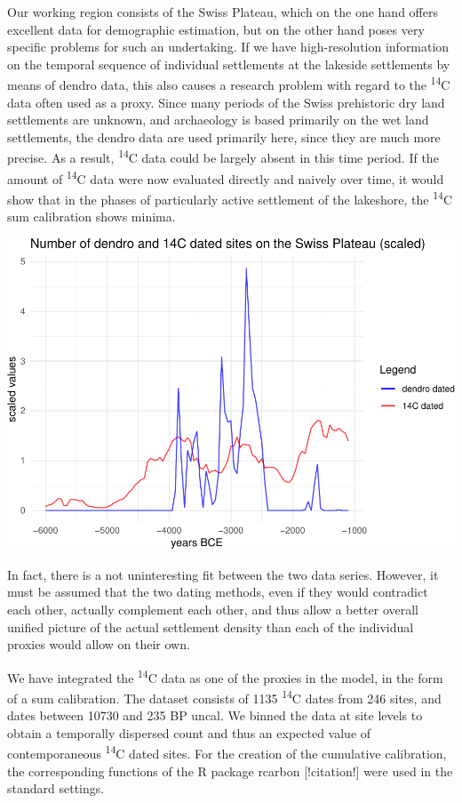 \documentclass[
]{article}
\begin{document}
Our working region consists of the Swiss Plateau, which on the one hand offers excellent data for demographic estimation, but on the other hand poses very specific problems for such an undertaking. If we have high-resolution information on the temporal sequence of individual settlements at the lakeside settlements by means of dendro data, this also causes a research problem with regard to the \textsuperscript{14}C data often used as a proxy. Since many periods of the Swiss prehistoric dry land settlements are unknown, and archaeology is based primarily on the wet land settlements, the dendro data are used primarily here, since they are much more precise. As a result, \textsuperscript{14}C data could be largely absent in this time period. If the amount of \textsuperscript{14}C data were now evaluated directly and naively over time, it would show that in the phases of particularly active settlement of the lakeshore, the \textsuperscript{14}C sum calibration shows minima.

\includegraphics{../figures/unnamed-chunk-2-1.pdf}

In fact, there is a not uninteresting fit between the two data series. However, it must be assumed that the two dating methods, even if they would contradict each other, actually complement each other, and thus allow a better overall unified picture of the actual settlement density than each of the individual proxies would allow on their own.

We have integrated the \textsuperscript{14}C data as one of the proxies in the model, in the form of a sum calibration. The dataset consists of 1135 \textsuperscript{14}C dates from 246 sites, and dates between 10730 and 235 BP uncal. We binned the data at site levels to obtain a temporally dispersed count and thus an expected value of contemporaneous \textsuperscript{14}C dated sites. For the creation of the cumulative calibration, the corresponding functions of the R package rcarbon {[}!citation!{]} were used in the standard settings.
\end{document}
